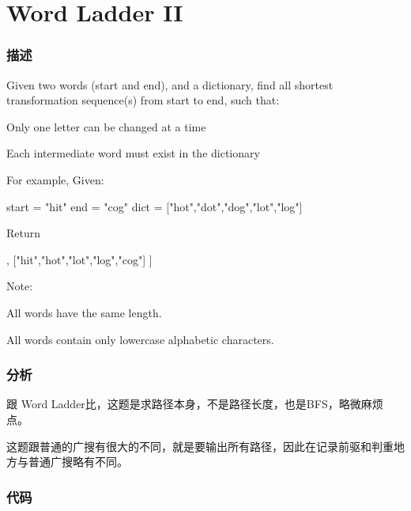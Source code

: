 \section{Word Ladder II} %
\label{sec:word-ladder-ii}


\subsubsection{描述}
Given two words (start and end), and a dictionary, find all shortest transformation sequence(s) from start to end, such that:
\begindot
\item Only one letter can be changed at a time
\item Each intermediate word must exist in the dictionary
\myenddot

For example, Given:
\begin{Code}
start = "hit"
end = "cog"
dict = ["hot","dot","dog","lot","log"]
\end{Code}
Return
\begin{Code}
[
    ["hit","hot","dot","dog","cog"],
    ["hit","hot","lot","log","cog"]
]
\end{Code}

Note:
\begindot
\item All words have the same length.
\item All words contain only lowercase alphabetic characters.
\myenddot


\subsubsection{分析}
跟 Word Ladder比，这题是求路径本身，不是路径长度，也是BFS，略微麻烦点。

这题跟普通的广搜有很大的不同，就是要输出所有路径，因此在记录前驱和判重地方与普通广搜略有不同。


\subsubsection{代码}

